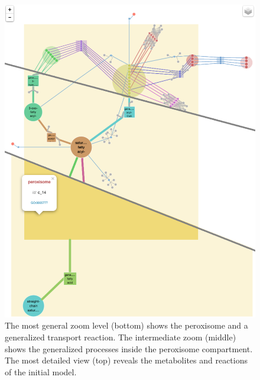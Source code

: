 \documentclass{bmcart}
\begin{document}
\begin{backmatter}
  \begin{figure}[h!]
 \includegraphics[scale=1]{figure2.eps}
  \caption{
  \label{fig:zoom_levels}  
      The most general zoom level (bottom) shows the peroxisome and a generalized transport reaction. The intermediate zoom (middle) shows the generalized processes inside the peroxisome compartment. The most detailed view (top) reveals the metabolites and reactions of the initial model.}
      \end{figure}


\end{backmatter}
\end{document}
